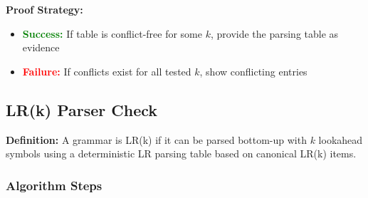 \textbf{Proof Strategy:}
\begin{itemize}
    \item \textcolor{green}{\textbf{Success:}} If table is conflict-free for some $k$, provide the parsing table as evidence
    \item \textcolor{red}{\textbf{Failure:}} If conflicts exist for all tested $k$, show conflicting entries
\end{itemize}

\subsection{LR(k) Parser Check}

\textbf{Definition:} A grammar is LR(k) if it can be parsed bottom-up with $k$ lookahead symbols using a deterministic LR parsing table based on canonical LR(k) items.

\subsubsection{Algorithm Steps}

